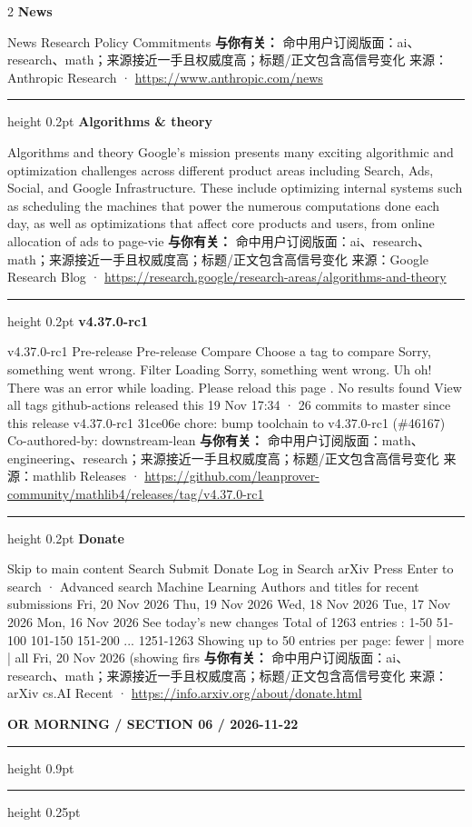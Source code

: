 \documentclass[10.5pt]{ctexart}
\begin{document}
\begin{multicols}{2}
{\large\bfseries News}\par
News Research Policy Commitments
\textbf{与你有关：} 命中用户订阅版面：ai、research、math；来源接近一手且权威度高；标题/正文包含高信号变化
{\footnotesize\color{ormuted} 来源：Anthropic Research · \url{https://www.anthropic.com/news}}
\vspace{2mm}
\hrule height 0.2pt
\vspace{2mm}
{\large\bfseries Algorithms \& theory}\par
Algorithms and theory Google’s mission presents many exciting algorithmic and optimization challenges across different product areas including Search, Ads, Social, and Google Infrastructure. These include optimizing internal systems such as scheduling the machines that power the numerous computations done each day, as well as optimizations that affect core products and users, from online allocation of ads to page-vie
\textbf{与你有关：} 命中用户订阅版面：ai、research、math；来源接近一手且权威度高；标题/正文包含高信号变化
{\footnotesize\color{ormuted} 来源：Google Research Blog · \url{https://research.google/research-areas/algorithms-and-theory}}
\vspace{2mm}
\hrule height 0.2pt
\vspace{2mm}
{\large\bfseries v4.37.0-rc1}\par
v4.37.0-rc1 Pre-release Pre-release Compare Choose a tag to compare Sorry, something went wrong. Filter Loading Sorry, something went wrong. Uh oh! There was an error while loading. Please reload this page . No results found View all tags github-actions released this 19 Nov 17:34 · 26 commits to master since this release v4.37.0-rc1 31ce06e chore: bump toolchain to v4.37.0-rc1 (\#46167) Co-authored-by: downstream-lean
\textbf{与你有关：} 命中用户订阅版面：math、engineering、research；来源接近一手且权威度高；标题/正文包含高信号变化
{\footnotesize\color{ormuted} 来源：mathlib Releases · \url{https://github.com/leanprover-community/mathlib4/releases/tag/v4.37.0-rc1}}
\vspace{2mm}
\hrule height 0.2pt
\vspace{2mm}
{\large\bfseries Donate}\par
Skip to main content Search Submit Donate Log in Search arXiv Press Enter to search · Advanced search Machine Learning Authors and titles for recent submissions Fri, 20 Nov 2026 Thu, 19 Nov 2026 Wed, 18 Nov 2026 Tue, 17 Nov 2026 Mon, 16 Nov 2026 See today's new changes Total of 1263 entries : 1-50 51-100 101-150 151-200 ... 1251-1263 Showing up to 50 entries per page: fewer | more | all Fri, 20 Nov 2026 (showing firs
\textbf{与你有关：} 命中用户订阅版面：ai、research、math；来源接近一手且权威度高；标题/正文包含高信号变化
{\footnotesize\color{ormuted} 来源：arXiv cs.AI Recent · \url{https://info.arxiv.org/about/donate.html}}
\end{multicols}
\newpage
{\small\bfseries OR MORNING / SECTION 06 / 2026-11-22}
\vspace{2mm}
\hrule height 0.9pt
\vspace{1.5mm}
\hrule height 0.25pt
\vspace{4mm}
\end{document}
